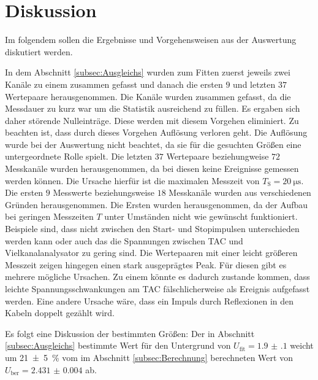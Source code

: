 
\section{Diskussion}
\label{sec:Diskussion}
Im folgendem sollen die Ergebnisse und Vorgehensweisen aus der Auswertung diskutiert werden.

In dem Abschnitt \ref{subsec:Ausgleichs} wurden zum Fitten zuerst jeweils zwei Kanäle zu einem zusammen gefasst und danach die ersten $9$ und letzten $37$ Wertepaare herausgenommen.
Die Kanäle wurden zusammen gefasst, da die Messdauer zu kurz war um die Statistik ausreichend zu füllen. Es ergaben sich daher störende Nulleinträge. Diese werden mit diesem Vorgehen eliminiert. Zu beachten ist, dass durch dieses Vorgehen Auflösung verloren geht. Die Auflösung wurde bei der Auswertung nicht beachtet, da sie für die gesuchten Größen eine untergeordnete Rolle spielt. Die letzten $37$ Wertepaare beziehungweise $72$ Messkanäle wurden herausgenommen, da bei diesen keine Ereignisse gemessen werden können. Die Ursache hierfür ist die maximalen Messzeit von $T_\text{S}=\SI{20}{\micro\second}$. Die ersten $9$ Messwerte beziehungsweise $18$ Messkanäle wurden aus verschiedenen Gründen herausgenommen. Die Ersten wurden herausgenommen, da der Aufbau bei geringen Messzeiten $T$ unter Umständen nicht wie gewünscht funktioniert. Beispiele sind, dass nicht zwischen den Start- und Stopimpulsen unterschieden werden kann oder auch das die Spannungen zwischen TAC und Vielkanalanalysator zu gering sind. Die Wertepaaren mit einer leicht größeren Messzeit zeigen hingegen einen stark ausgeprägtes Peak. Für diesen gibt es mehrere mögliche Ursachen. Zu einem könnte es dadurch zustande kommen, dass leichte Spannungsschwankungen am TAC fälschlicherweise als Ereignis aufgefasst werden. Eine andere Ursache wäre, dass ein Impuls  durch Reflexionen in den Kabeln doppelt gezählt wird.





Es folgt eine Diskussion der bestimmten Größen:
Der in Abschnitt \ref{subsec:Ausgleichs} bestimmte Wert für den Untergrund von $U_\text{fit}=\num{1.9(1)}$ weicht um \SI{21(5)}{\percent} vom im Abschnitt \ref{subsec:Berechnung} berechneten Wert von $U_\text{ber}=\num{2.431(4)}$ ab.


